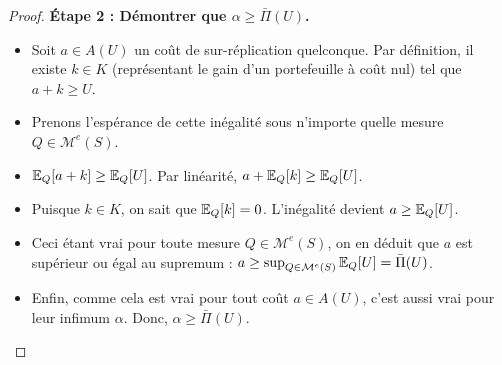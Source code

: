 \begin{proof}
\textbf{Étape 2 : Démontrer que $\alpha \ge \bar\Pi(U)$.}
\begin{itemize}
    \item Soit $a \in A(U)$ un coût de sur-réplication quelconque. Par définition, il existe $k \in K$ (représentant le gain d'un portefeuille à coût nul) tel que $a + k \ge U$.
    \item Prenons l'espérance de cette inégalité sous n'importe quelle mesure $Q \in \mathcal{M}^e(S)$.
    \item $\mathbb{E}_Q[a + k] \ge \mathbb{E}_Q[U]$. Par linéarité, $a + \mathbb{E}_Q[k] \ge \mathbb{E}_Q[U]$.
    \item Puisque $k \in K$, on sait que $\mathbb{E}_Q[k]=0$. L'inégalité devient $a \ge \mathbb{E}_Q[U]$.
    \item Ceci étant vrai pour toute mesure $Q \in \mathcal{M}^e(S)$, on en déduit que $a$ est supérieur ou égal au supremum : $a \ge \sup_{Q \in \mathcal{M}^e(S)} \mathbb{E}_Q[U] = \bar\Pi(U)$.
    \item Enfin, comme cela est vrai pour tout coût $a \in A(U)$, c'est aussi vrai pour leur infimum $\alpha$. Donc, $\alpha \ge \bar\Pi(U)$.
\end{itemize}


\end{proof}
